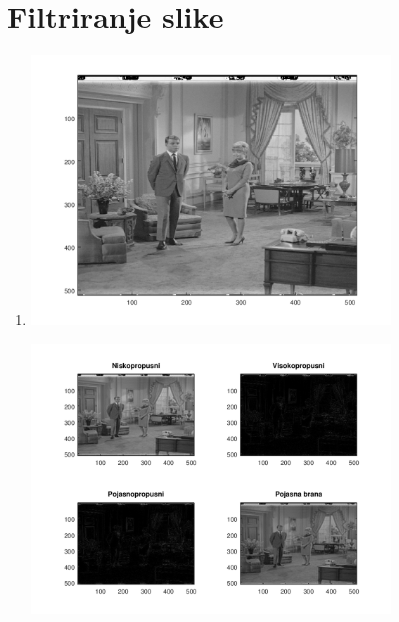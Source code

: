 \documentclass[12pt, a4]{report}
\begin{document}
        \section{Filtriranje slike}
            \begin{enumerate}
                \item
                    \begin{minipage}{\linewidth}
                        \centering
                        \includegraphics[width=0.75\textwidth]{couple}
                    \end{minipage}
                    \begin{minipage}{\linewidth}
                        \centering
                        \includegraphics[width=0.75\textwidth]{filteri}
                    \end{minipage}
                
            \end{enumerate}
\end{document}
